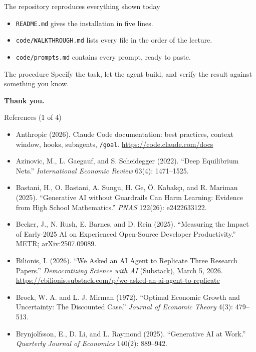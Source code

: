 \documentclass[aspectratio=169,10pt]{beamer}
\begin{document}
\begin{frame}{The repository reproduces everything shown today}
\begin{itemize}\itemsep8pt
  \item \texttt{README.md} gives the installation in five lines.
  \item \texttt{code/WALKTHROUGH.md} lists every file in the order of the lecture.
  \item \texttt{code/prompts.md} contains every prompt, ready to paste.
\end{itemize}

\vspace{0.9em}
\begin{block}{The procedure}
Specify the task, let the agent build, and verify the result against something you know.
\end{block}

\vspace{0.9em}
\begin{center}
\textbf{Thank you.}
\end{center}
\end{frame}

\begin{frame}{References (1 of 4)}
\footnotesize
\begin{itemize}\itemsep3pt
  \item Anthropic (2026). Claude Code documentation: best practices, context window, hooks, subagents, \texttt{/goal}. \url{https://code.claude.com/docs}
  \item Azinovic, M., L. Gaegauf, and S. Scheidegger (2022). ``Deep Equilibrium Nets.'' \emph{International Economic Review} 63(4): 1471--1525.
  \item Bastani, H., O. Bastani, A. Sungu, H. Ge, \"O. Kabak\c{c}\i, and R. Mariman (2025). ``Generative AI without Guardrails Can Harm Learning: Evidence from High School Mathematics.'' \emph{PNAS} 122(26): e2422633122.
  \item Becker, J., N. Rush, E. Barnes, and D. Rein (2025). ``Measuring the Impact of Early-2025 AI on Experienced Open-Source Developer Productivity.'' METR; arXiv:2507.09089.
  \item Bilionis, I. (2026). ``We Asked an AI Agent to Replicate Three Research Papers.'' \emph{Democratizing Science with AI} (Substack), March 5, 2026. \url{https://ebilionis.substack.com/p/we-asked-an-ai-agent-to-replicate}
  \item Brock, W. A. and L. J. Mirman (1972). ``Optimal Economic Growth and Uncertainty: The Discounted Case.'' \emph{Journal of Economic Theory} 4(3): 479--513.
  \item Brynjolfsson, E., D. Li, and L. Raymond (2025). ``Generative AI at Work.'' \emph{Quarterly Journal of Economics} 140(2): 889--942.
\end{itemize}
\end{frame}
\end{document}
